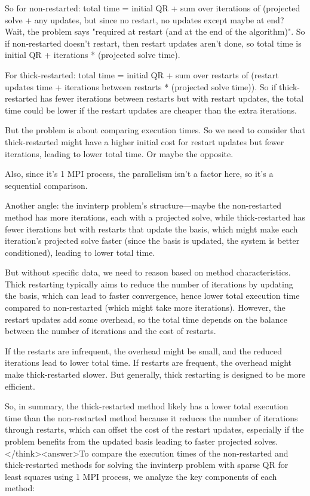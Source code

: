 So for non-restarted: total time = initial QR + sum over iterations of (projected solve + any updates, but since no restart, no updates except maybe at end? Wait, the problem says "required at restart (and at the end of the algorithm)". So if non-restarted doesn't restart, then restart updates aren't done, so total time is initial QR + iterations * (projected solve time). 

For thick-restarted: total time = initial QR + sum over restarts of (restart updates time + iterations between restarts * (projected solve time)). So if thick-restarted has fewer iterations between restarts but with restart updates, the total time could be lower if the restart updates are cheaper than the extra iterations. 

But the problem is about comparing execution times. So we need to consider that thick-restarted might have a higher initial cost for restart updates but fewer iterations, leading to lower total time. Or maybe the opposite. 

Also, since it's 1 MPI process, the parallelism isn't a factor here, so it's a sequential comparison. 

Another angle: the invinterp problem's structure—maybe the non-restarted method has more iterations, each with a projected solve, while thick-restarted has fewer iterations but with restarts that update the basis, which might make each iteration's projected solve faster (since the basis is updated, the system is better conditioned), leading to lower total time. 

But without specific data, we need to reason based on method characteristics. Thick restarting typically aims to reduce the number of iterations by updating the basis, which can lead to faster convergence, hence lower total execution time compared to non-restarted (which might take more iterations). However, the restart updates add some overhead, so the total time depends on the balance between the number of iterations and the cost of restarts. 

If the restarts are infrequent, the overhead might be small, and the reduced iterations lead to lower total time. If restarts are frequent, the overhead might make thick-restarted slower. But generally, thick restarting is designed to be more efficient. 

So, in summary, the thick-restarted method likely has a lower total execution time than the non-restarted method because it reduces the number of iterations through restarts, which can offset the cost of the restart updates, especially if the problem benefits from the updated basis leading to faster projected solves.</think><answer>To compare the execution times of the non-restarted and thick-restarted methods for solving the invinterp problem with sparse QR for least squares using 1 MPI process, we analyze the key components of each method:  


